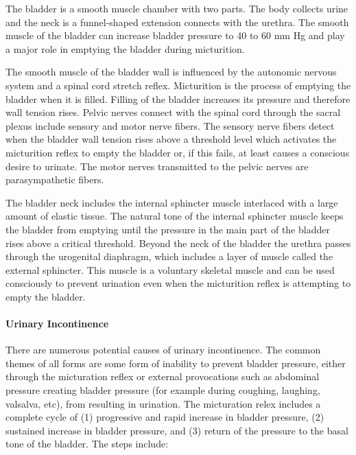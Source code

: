 The bladder is a smooth muscle chamber with two parts. The body collects urine and the neck is a funnel-shaped extension connects with the urethra. The smooth muscle of the bladder can increase bladder pressure to 40 to 60 mm Hg and play a major role in emptying the bladder during micturition.

The smooth muscle of the bladder wall is influenced by the autonomic nervous system and a spinal cord stretch reflex. Micturition is the process of emptying the bladder when it is filled. Filling of the bladder increases its pressure and therefore wall tension rises. Pelvic nerves connect with the spinal cord through the sacral plexus include sensory and motor nerve fibers. The sensory nerve fibers detect when the bladder wall tension rises above a threshold level which activates the micturition reflex to empty the bladder or, if this fails, at least causes a conscious desire to urinate. The motor nerves transmitted to the pelvic nerves are parasympathetic fibers.

The bladder neck includes the internal sphincter muscle interlaced with a large amount of elastic tissue. The natural tone of the internal sphincter muscle keeps the bladder from emptying until the pressure in the main part of the bladder rises above a critical threshold. Beyond the neck of the bladder the urethra passes through the urogenital diaphragm, which includes a layer of muscle called the external sphincter. This muscle is a voluntary skeletal muscle and can be used consciously to prevent urination even when the micturition reflex is attempting to empty the bladder.

\paragraph{Urinary Incontinence}

There are numerous potential causes of urinary incontinence. The common themes of all forms are some form of inability to prevent bladder pressure, either through the micturation reflex or external provocations such as abdominal pressure creating bladder pressure (for example during coughing, laughing, valsalva, etc), from resulting in urination. The micturation relex includes a complete cycle of (1) progressive and rapid increase in bladder pressure, (2) sustained increase in bladder pressure, and (3) return of the pressure to the basal tone of the bladder. 
The steps include:

